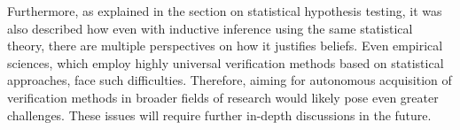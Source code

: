 
Furthermore, as explained in the section on statistical hypothesis testing, it was also described how even with inductive inference using the same statistical theory, there are multiple perspectives on how it justifies beliefs. Even empirical sciences, which employ highly universal verification methods based on statistical approaches, face such difficulties. Therefore, aiming for autonomous acquisition of verification methods in broader fields of research would likely pose even greater challenges. These issues will require further in-depth discussions in the future.



